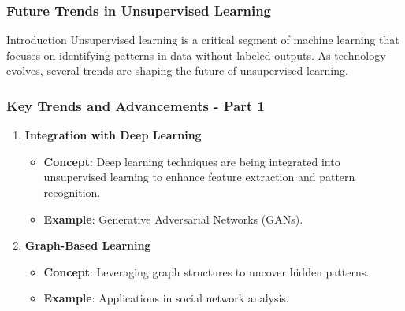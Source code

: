 \documentclass[aspectratio=169]{beamer}
\begin{document}
\begin{frame}[fragile]
    \frametitle{Future Trends in Unsupervised Learning}
    \begin{block}{Introduction}
        Unsupervised learning is a critical segment of machine learning that focuses on identifying patterns in data without labeled outputs. As technology evolves, several trends are shaping the future of unsupervised learning.
    \end{block}
\end{frame}

\begin{frame}[fragile]
    \frametitle{Key Trends and Advancements - Part 1}
    \begin{enumerate}
        \item \textbf{Integration with Deep Learning}
            \begin{itemize}
                \item \textbf{Concept}: Deep learning techniques are being integrated into unsupervised learning to enhance feature extraction and pattern recognition.
                \item \textbf{Example}: Generative Adversarial Networks (GANs).
            \end{itemize}
        
        \item \textbf{Graph-Based Learning}
            \begin{itemize}
                \item \textbf{Concept}: Leveraging graph structures to uncover hidden patterns.
                \item \textbf{Example}: Applications in social network analysis.
            \end{itemize}
    \end{enumerate}
\end{frame}
\end{document}
